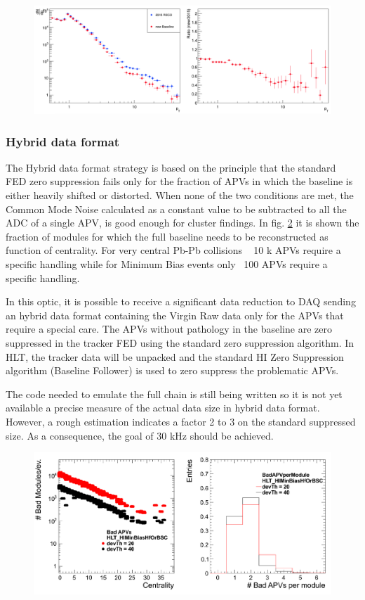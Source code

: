   \begin{figure}[htbp]
\begin{center}
\includegraphics[width=.80\textwidth]{figures/DerivativeFollowerEfficiency.png}
\caption{}
\label{fig:stripDerivFollowerPerf}
\end{center}
\end{figure}


\subsubsection{Hybrid data format \label{subsubsec:hybridtracker}}
The Hybrid data format strategy is based on the principle that the standard FED zero suppression fails only for the fraction of APVs in which the baseline is either heavily shifted or distorted. When none of the two conditions are met, the Common Mode Noise calculated as a constant value to be subtracted to all the ADC of a single APV, is good enough for cluster findings. In fig. \ref{fig:stripBadAPV} it is shown the fraction of modules for which the full baseline needs to be reconstructed as function of centrality. 
For very central Pb-Pb collisions ~ 10 k APVs require a specific handling while for Minimum Bias events only ~100 APVs require a specific handling.

In this optic, it is possible to receive a significant data reduction to DAQ sending an hybrid data format containing the Virgin Raw data only for the APVs that require a special care. The APVs without pathology in the baseline are zero suppressed in the tracker FED using the standard zero suppression algorithm. In HLT, the tracker data will be unpacked and the standard HI Zero Suppression algorithm (Baseline Follower) is used to zero suppress the problematic APVs. 

The code needed to emulate the full chain is still being written so it is not yet available a precise measure of the actual data size in hybrid data format. However, a rough estimation indicates a factor 2 to 3 on the standard suppressed size. As a consequence, the goal of 30 kHz should be achieved.

    


 \begin{figure}[htbp]
\begin{center}
\includegraphics[width=.80\textwidth]{figures/BadAPV.pdf}
\caption{}
\label{fig:stripBadAPV}
\end{center}
\end{figure}
